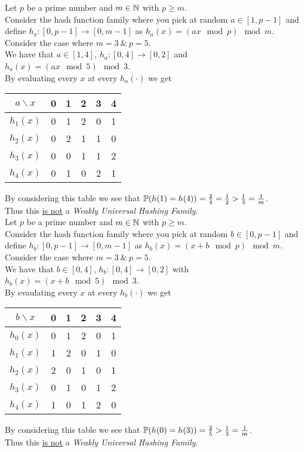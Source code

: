 \documentclass[11pt,a4paper]{article}
\begin{document}
\qpart
Let $p$ be a prime number and $m\in\mathbb{N}$ with $p\geq m$.\\
Consider the hash function family where you pick at random $a\in[1,p-1]$ and define $h_a:[0,p-1]\to[0,m-1]$ as $h_a(x)=(ax\mod p)\mod m$.\\

\apart
Consider the case where $m=3\ \&\ p=5$.\\
We have that $a\in[1,4]$,  $h_a:[0,4]\to[0,2]$ and $h_a(x)=(ax\mod5)\mod3$.\\
By evaluating every $x$ at every $h_a(\cdot)$ we get
\begin{center}
\begin{tabular}{c|ccccc}
$a\backslash x$&0&1&2&3&4\\\hline
$h_1(x)$&0&1&2&0&1\\
$h_2(x)$&0&2&1&1&0\\
$h_3(x)$&0&0&1&1&2\\
$h_4(x)$&0&1&0&2&1
\end{tabular}
\end{center}
By considering this table we see that $\mathbb{P}(h(1)=h(4))=\frac{2}{4}=\frac{1}{2}>\frac{1}{3}=\frac{1}{m}$.\\
Thus this \underline{is not} a \textit{Weakly Universal Hashing Family}.\\

\qpart
Let $p$ be a prime number and $m\in\mathbb{N}$ with $p\geq m$.\\
Consider the hash function family where you pick at random $b\in[0,p-1]$ and define $h_b:[0,p-1]\to[0,m-1]$ as $h_b(x)=(x+b\mod p)\mod m$.\\

\apart
Consider the case where $m=3\ \&\ p=5$.\\
We have that $b\in[0,4]$, $h_b:[0,4]\to[0,2]$ with $h_b(x)=(x+b\mod5)\mod3$.\\
By evaulating every $x$ at every $h_b(\cdot)$ we get
\begin{center}
\begin{tabular}{c|ccccc}
$b\backslash x$&0&1&2&3&4\\\hline
$h_0(x)$&0&1&2&0&1\\
$h_1(x)$&1&2&0&1&0\\
$h_2(x)$&2&0&1&0&1\\
$h_3(x)$&0&1&0&1&2\\
$h_4(x)$&1&0&1&2&0
\end{tabular}
\end{center}
By considering this table we see that $\mathbb{P}(h(0)=h(3))=\frac{2}{5}>\frac{1}{3}=\frac{1}{m}$.\\
Thus this \underline{is not} a \textit{Weakly Universal Hashing Family}.\\
\end{document}
